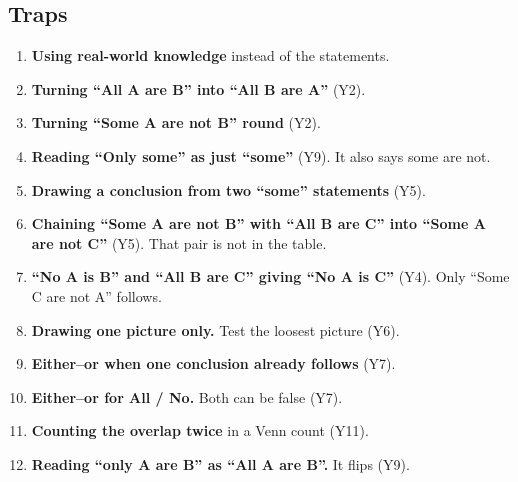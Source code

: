 \documentclass[11pt,a4paper]{article}
\let\oldsubsection\subsection
\renewcommand{\subsection}{\needspace{9\baselineskip}\oldsubsection}
\begin{document}
\subsection*{Traps}
\begin{enumerate}
\item \textbf{Using real-world knowledge} instead of the statements.
\item \textbf{Turning ``All A are B'' into ``All B are A''} (Y2).
\item \textbf{Turning ``Some A are not B'' round} (Y2).
\item \textbf{Reading ``Only some'' as just ``some''} (Y9). It also says some are not.
\item \textbf{Drawing a conclusion from two ``some'' statements} (Y5).
\item \textbf{Chaining ``Some A are not B'' with ``All B are C'' into ``Some A are not C''} (Y5). That pair is not in the table.
\item \textbf{``No A is B'' and ``All B are C'' giving ``No A is C''} (Y4). Only ``Some C are not A'' follows.
\item \textbf{Drawing one picture only.} Test the loosest picture (Y6).
\item \textbf{Either--or when one conclusion already follows} (Y7).
\item \textbf{Either--or for All / No.} Both can be false (Y7).
\item \textbf{Counting the overlap twice} in a Venn count (Y11).
\item \textbf{Reading ``only A are B'' as ``All A are B''.} It flips (Y9).
\end{enumerate}
\end{document}
